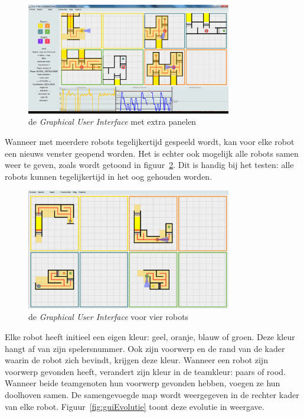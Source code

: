 \documentclass[eind]{penoverslag}
\begin{document}
\begin{figure}[h]
\centering
	\includegraphics[width=0.8\textwidth]{guiALL}
\caption{de \textit{Graphical User Interface} met extra panelen}
\label{fig:guiAll}
\end{figure}

Wanneer met meerdere robots tegelijkertijd gespeeld wordt, kan voor elke robot een nieuws venster geopend worden. Het is echter ook mogelijk alle robots samen weer te geven, zoals wordt getoond in figuur~\ref{fig:gui4}. Dit is handig bij het testen: alle robots kunnen tegelijkertijd in het oog gehouden worden.

\begin{figure}[h]
\centering
	\includegraphics[width=0.8\textwidth]{gui4Robots}
\caption{de \textit{Graphical User Interface} voor vier robots}
\label{fig:gui4}
\end{figure}

Elke robot heeft initieel een eigen kleur: geel, oranje, blauw of groen. Deze kleur hangt af van zijn spelersnummer. Ook zijn voorwerp en de rand van de kader waarin de robot zich bevindt, krijgen deze kleur. Wanneer een robot zijn voorwerp gevonden heeft, verandert zijn kleur in de teamkleur: paars of rood. Wanneer beide teamgenoten hun voorwerp gevonden hebben, voegen ze hun doolhoven samen. De samengevoegde map wordt weergegeven in de rechter kader van elke robot. Figuur~\ref{fig:guiEvolutie} toont deze evolutie in weergave.\\
\end{document}
